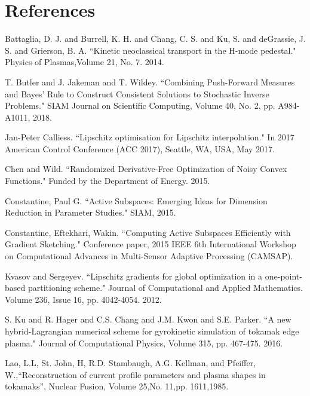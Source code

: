 \documentclass[11pt]{beamer}
\begin{document}
\section{References}
\begin{frame}[allowframebreaks]

\begin{thebibliography}{65}

\tiny

 Battaglia, D. J.  and Burrell, K. H.  and Chang, C. S.  and Ku, S.  and deGrassie, J. S.  and Grierson, B. A. ``Kinetic neoclassical transport in the H-mode pedestal." Physics of Plasmas,Volume 21, No. 7. 2014.


 T. Butler and J. Jakeman and T. Wildey.
``Combining Push-Forward Measures and Bayes' Rule to Construct Consistent Solutions to Stochastic Inverse Problems." SIAM Journal on Scientific Computing, Volume 40, No. 2, pp. A984-A1011, 2018.

 Jan-Peter Calliess. ``Lipschitz optimisation for Lipschitz interpolation." In 2017 American Control Conference (ACC 2017), Seattle, WA, USA, May 2017.

 Chen and Wild. ``Randomized Derivative-Free Optimization of Noisy Convex Functions." Funded by the Department of Energy. 2015.

 Constantine, Paul G. ``Active Subspaces: Emerging Ideas for Dimension Reduction in Parameter Studies." SIAM, 2015.

 Constantine, Eftekhari, Wakin. ``Computing Active Subspaces Efficiently with Gradient Sketching." Conference paper, 2015 IEEE 6th International Workshop on Computational Advances in Multi-Sensor Adaptive Processing (CAMSAP).


 Kvasov and Sergeyev. ``Lipschitz gradients for global optimization in a one-point-based partitioning scheme." Journal of Computational and Applied Mathematics. Volume 236, Issue 16, pp. 4042-4054. 2012.

 S. Ku and R. Hager and C.S. Chang and J.M. Kwon and S.E. Parker. ``A new hybrid-Lagrangian numerical scheme for gyrokinetic simulation of tokamak edge plasma." Journal of Computational Physics, Volume 315, pp. 467-475. 2016.

 Lao, L.L, St. John, H, R.D. Stambaugh, A.G. Kellman, and Pfeiffer, W.,``Reconstruction of current profile parameters and plasma shapes in tokamaks'', Nuclear Fusion, Volume 25,No. 11,pp. 1611,1985.


\end{thebibliography}
\end{frame}
\end{document}
